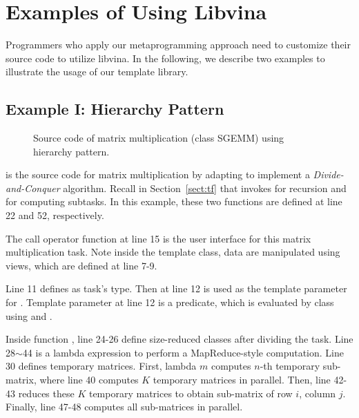 \section{Examples of Using Libvina}
\label{sec:adaption}

Programmers who apply our metaprogramming approach need to customize their
source code to utilize libvina.
In the following, we describe two examples 
to illustrate the usage of our template library. 


\subsection{Example I: Hierarchy Pattern}

\begin{figure}[hbt]
  \caption{Source code of matrix multiplication (class SGEMM) using hierarchy pattern.}
  \label{fig:sgemm}
\end{figure}

 is the source code for matrix multiplication by adapting 
to implement a \emph{Divide-and-Conquer} algorithm. Recall in Section~\ref{sect:tf} that
 invokes  for recursion and 
for computing subtasks. In this example, these two functions are defined at line
22 and 52, respectively.

The call operator function at line 15 is the user interface for this matrix multiplication task.
Note inside the template class, data are manipulated using views, which are defined
at line 7-9.

Line 11 defines  as task's type. Then at line 12  is used as
the template parameter  for . Template parameter  
at line 12 is a predicate, which is evaluated by  class 
using  and .

Inside function , line 24-26 define size-reduced classes after dividing the task. 
Line 28$\sim$44 is a lambda expression to perform a MapReduce-style computation.
Line 30 defines temporary matrices.
First, lambda $m$ computes $n$-th temporary sub-matrix, where line 40 computes
$K$ temporary matrices in parallel. Then, line 42-43 reduces these
$K$ temporary matrices to obtain sub-matrix of row $i$, column $j$. 
Finally, line 47-48 computes all sub-matrices in parallel.

